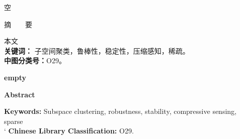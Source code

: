 \documentclass[main]{subfiles}
\begin{document}
\newpage


\centerline{空}
\vspace{6mm}

\centerline{\heiti 摘\ \ \ \ 要}
\vspace{2mm}

本文
\\
{\bf 关键词：} 子空间聚类，鲁棒性，稳定性，压缩感知，稀疏。\\
{\bf 中图分类号：}\quad O29。


\newpage


\centerline{\large\bf empty}
\vspace{6mm}

\centerline{\bf\large Abstract}
\vspace{2mm}

{\bf Keywords: }  Subspace clustering, robustness, stability, compressive
sensing, sparse\\`
{\bf Chinese Library Classification: }\quad O29.
\end{document}
